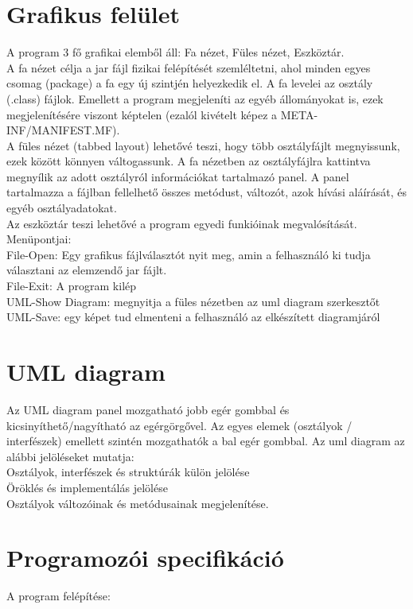 \documentclass{article}
\begin{document}
\section*{Grafikus felület}
A program 3 fő grafikai elemből áll: Fa nézet, Füles nézet, Eszköztár.\\
A fa nézet célja a jar fájl fizikai felépítését szemléltetni, ahol minden egyes csomag (package) a fa egy új
szintjén helyezkedik el. A fa levelei az osztály (.class) fájlok. Emellett a program megjeleníti az egyéb állományokat is,
ezek megjelenítésére viszont képtelen (ezalól kivételt képez a META-INF/MANIFEST.MF).\\
A füles nézet (tabbed layout) lehetővé teszi, hogy több osztályfájlt megnyissunk, ezek között könnyen váltogassunk.
A fa nézetben az osztályfájlra kattintva megnyílik az adott osztályról információkat tartalmazó panel. A panel tartalmazza
a fájlban fellelhető összes metódust, változót, azok hívási aláírását, és egyéb osztályadatokat.\\
Az eszköztár teszi lehetővé a program egyedi funkióinak megvalósítását. Menüpontjai:\\
File-Open: Egy grafikus fájlválasztót nyit meg, amin a felhasználó ki tudja választani az elemzendő jar fájlt.\\
File-Exit: A program kilép\\
UML-Show Diagram: megnyitja a füles nézetben az uml diagram szerkesztőt\\
UML-Save: egy képet tud elmenteni a felhasználó az elkészített diagramjáról

\section*{UML diagram}
Az UML diagram panel mozgatható jobb egér gombbal és kicsinyíthető/nagyítható az egérgörgővel.
Az egyes elemek (osztályok / interfészek) emellett szintén mozgathatók a bal egér gombbal.
Az uml diagram az alábbi jelöléseket mutatja:\\
Osztályok, interfészek és struktúrák külön jelölése\\
Öröklés és implementálás jelölése\\
Osztályok változóinak és metódusainak megjelenítése.

\section*{Programozói specifikáció}
A program felépítése:
\end{document}
